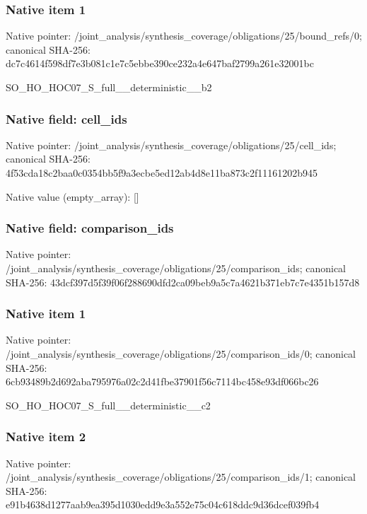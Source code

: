 \documentclass[10pt,a4paper]{article}
\begin{document}
\subsubsection{Native item 1}
Native pointer: /joint\_\allowbreak{}analysis/synthesis\_\allowbreak{}coverage/obligations/25/bound\_\allowbreak{}refs/0; canonical SHA-256: dc7c4614f598df7e3b081c1e7c5ebbe390ce232a4e647baf2799a261e32001bc

\begingroup\raggedright\sloppy SO\_\allowbreak{}HO\_\allowbreak{}HOC07\_\allowbreak{}S\_\allowbreak{}full\_\allowbreak{}\_\allowbreak{}deterministic\_\allowbreak{}\_\allowbreak{}b2\par\endgroup

\subsubsection{Native field: cell\_\allowbreak{}ids}
Native pointer: /joint\_\allowbreak{}analysis/synthesis\_\allowbreak{}coverage/obligations/25/cell\_\allowbreak{}ids; canonical SHA-256: 4f53cda18c2baa0c0354bb5f9a3ecbe5ed12ab4d8e11ba873c2f11161202b945

Native value (empty\_\allowbreak{}array): []

\subsubsection{Native field: comparison\_\allowbreak{}ids}
Native pointer: /joint\_\allowbreak{}analysis/synthesis\_\allowbreak{}coverage/obligations/25/comparison\_\allowbreak{}ids; canonical SHA-256: 43dcf397d5f39f06f288690dfd2ca09beb9a5c7a4621b371eb7c7e4351b157d8

\subsubsection{Native item 1}
Native pointer: /joint\_\allowbreak{}analysis/synthesis\_\allowbreak{}coverage/obligations/25/comparison\_\allowbreak{}ids/0; canonical SHA-256: 6cb93489b2d692aba795976a02c2d41fbe37901f56c7114bc458e93df066bc26

\begingroup\raggedright\sloppy SO\_\allowbreak{}HO\_\allowbreak{}HOC07\_\allowbreak{}S\_\allowbreak{}full\_\allowbreak{}\_\allowbreak{}deterministic\_\allowbreak{}\_\allowbreak{}c2\par\endgroup

\subsubsection{Native item 2}
Native pointer: /joint\_\allowbreak{}analysis/synthesis\_\allowbreak{}coverage/obligations/25/comparison\_\allowbreak{}ids/1; canonical SHA-256: e91b4638d1277aab9ea395d1030edd9e3a552e75c04c618ddc9d36dcef039fb4
\end{document}
